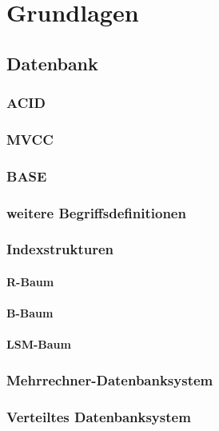 \chapter{Grundlagen}


\section{Datenbank}

\subsection{ACID}

\subsection{MVCC}

\subsection{BASE}

\subsection{weitere Begriffsdefinitionen}

\subsection{Indexstrukturen}

\subsubsection{R-Baum}

\subsubsection{B-Baum}

\subsubsection{LSM-Baum}

\subsection{Mehrrechner-Datenbanksystem}

\subsection{Verteiltes Datenbanksystem}

